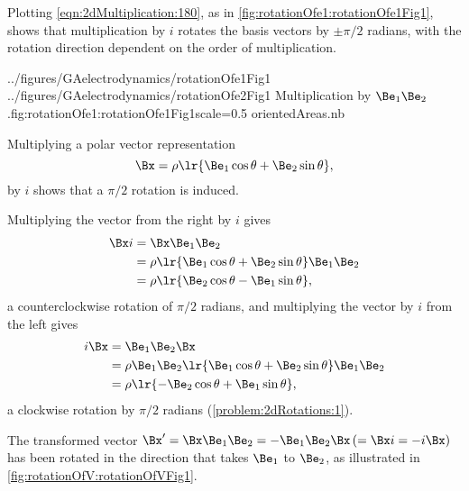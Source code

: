 %
%

Plotting \cref{eqn:2dMultiplication:180}, as in
\cref{fig:rotationOfe1:rotationOfe1Fig1},
 shows that multiplication by \( i \) rotates the  basis vectors by \( \pm \pi/2 \) radians,
with the
rotation direction dependent on the order of multiplication.

\mathImageTwoFigures
{../figures/GAelectrodynamics/rotationOfe1Fig1}
{../figures/GAelectrodynamics/rotationOfe2Fig1}
{Multiplication by \( \Be_1 \Be_2 \).}{fig:rotationOfe1:rotationOfe1Fig1}{scale=0.5}
{orientedAreas.nb}

Multiplying a polar vector representation
\begin{equation}\label{eqn:2dRotations:280}
   \Bx = \rho \lr{ \Be_1 \cos\theta + \Be_2 \sin\theta },
\end{equation}
by \( i \) shows that a \( \pi/2 \) rotation is induced.

Multiplying the vector from the right by \( i \) gives
\begin{equation}\label{eqn:2dRotations:300}
\begin{aligned}
\Bx i
&= \Bx \Be_1 \Be_2 \\
&= \rho \lr{ \Be_1 \cos\theta + \Be_2 \sin\theta } \Be_1 \Be_2 \\
&= \rho \lr{ \Be_2 \cos\theta - \Be_1 \sin\theta },
\end{aligned}
\end{equation}
a counterclockwise rotation of \( \pi/2 \) radians, and
multiplying the vector by \( i \) from the left gives
\begin{equation}\label{eqn:2dRotations:3}
\begin{aligned}
i \Bx
&= \Be_1 \Be_2 \Bx \\
&= \rho \Be_1 \Be_2 \lr{ \Be_1 \cos\theta + \Be_2 \sin\theta } \Be_1 \Be_2 \\
&= \rho \lr{ -\Be_2 \cos\theta + \Be_1 \sin\theta },
\end{aligned}
\end{equation}
a clockwise rotation by \( \pi/2 \) radians
(\cref{problem:2dRotations:1}).

The transformed vector \( \Bx' = \Bx \Be_1 \Be_2 = -\Be_1 \Be_2 \Bx \,(= \Bx i = -i \Bx) \) has been rotated in the direction that takes \( \Be_1 \) to \( \Be_2 \), as illustrated
in \cref{fig:rotationOfV:rotationOfVFig1}.

